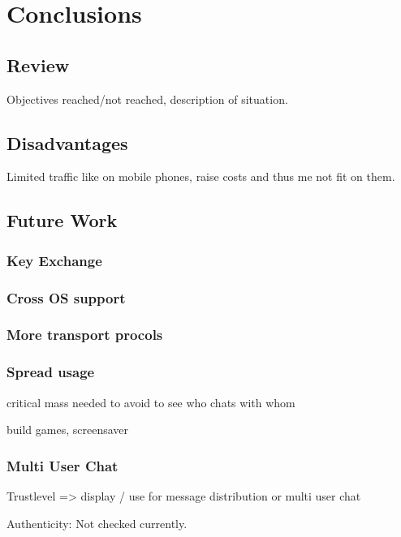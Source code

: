 \chapter{Conclusions}
\section{Review}
Objectives reached/not reached, description of situation.
\section{Disadvantages}
Limited traffic like on mobile phones, raise costs and thus me not
fit on them.
\section{Future Work}
\subsection{Key Exchange}
\subsection{Cross OS support}
\subsection{More transport procols}
\subsection{Spread usage}
critical mass needed to avoid to see who chats with whom

build games, screensaver
\subsection{Multi User Chat}

Trustlevel => display / use for message distribution or multi user chat

Authenticity: Not checked currently.
